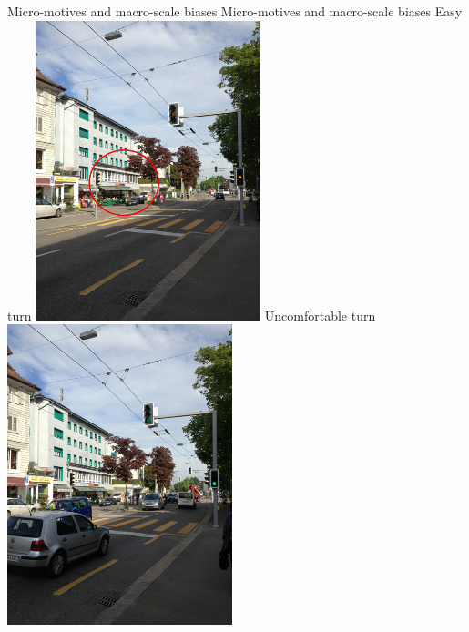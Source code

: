 \createfigure%
{Micro-motives and macro-scale biases}%
{Micro-motives and macro-scale biases}%
{\label{fig:hstp}}%
{%
 \createsubfigure%
  {Easy turn}%
  {\includegraphics[width=0.49\textwidth]{understanding/figures/IMG_3617.png}}%
  {\label{fig:migrosEasy}}%
  {}%
  \createsubfigure%
  {Uncomfortable turn}%
  {\includegraphics[width=0.49\textwidth]{understanding/figures/IMG_3616.png}}%
  {\label{fig:migrosDifficult}}%
  {}%
}%
{}




